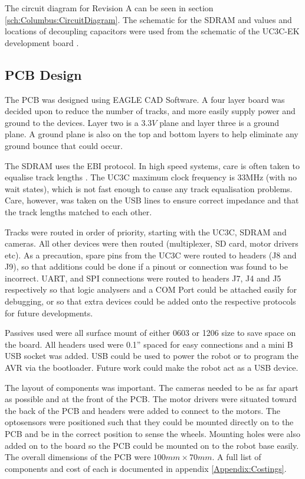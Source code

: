 The circuit diagram for Revision A can be seen in section \ref{sch:Columbus:CircuitDiagram}. The schematic for the SDRAM and values and locations of decoupling capacitors were used from the schematic of the UC3C-EK development board \citep{Atmel:UC3CEK}. 
\subsection{PCB Design}
The PCB was designed using EAGLE CAD Software. A four layer board was decided upon to reduce the number of tracks, and more easily supply power and ground to the devices. Layer two is a $3.3V$ plane and layer three is a ground plane. A ground plane is also on the top and bottom layers to help eliminate any ground bounce that could occur. 

The SDRAM uses the EBI protocol. In high speed systems, care is often taken to equalise track lengths \citep{liu2004equalization}. The UC3C maximum clock frequency is 33MHz (with no wait states), which is not fast enough to cause any track equalisation problems. Care, however, was taken on the USB lines to ensure correct impedance and that the track lengths matched to each other.

Tracks were routed in order of priority, starting with the UC3C, SDRAM and cameras. All other devices were then routed (\itc multiplexer, SD card, motor drivers etc). As a precaution, spare pins from the UC3C were routed to headers (J8 and J9), so that additions could be done if a pinout or connection was found to be incorrect. UART, \itc and SPI connections were routed to headers J7, J4 and J5 respectively so that logic analysers and a COM Port could be attached easily for debugging, or so that extra devices could be added onto the respective protocols for future developments. 

Passives used were all surface mount of either 0603 or 1206 size to save space on the board. All headers used were 0.1'' spaced for easy connections and a mini B USB socket was added. USB could be used to power the robot or to program the AVR via the bootloader. Future work could make the robot act as a USB device. 

The layout of components was important. The cameras needed to be as far apart as possible and at the front of the PCB. The motor drivers were situated toward the back of the PCB and headers were added to connect to the motors. The optosensors were positioned such that they could be mounted directly on to the PCB and be in the correct position to sense the wheels. Mounting holes were also added on to the board so the PCB could be mounted on to the robot base easily. The overall dimensions of the PCB were $100mm \times 70mm$. A full list of components and cost of each is documented in appendix \ref{Appendix:Costings}.

